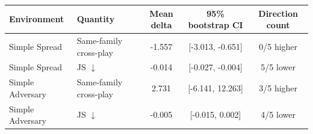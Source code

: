 \begin{tabular}{llccc}
\toprule
Environment & Quantity & Mean delta & 95\% bootstrap CI & Direction count \\
\midrule
Simple Spread & Same-family cross-play & -1.557 & [-3.013, -0.651] & 0/5 higher \\
Simple Spread & JS $\downarrow$ & -0.014 & [-0.027, -0.004] & 5/5 lower \\
\midrule
Simple Adversary & Same-family cross-play & 2.731 & [-6.141, 12.263] & 3/5 higher \\
Simple Adversary & JS $\downarrow$ & -0.005 & [-0.015, 0.002] & 4/5 lower \\
\bottomrule
\end{tabular}
